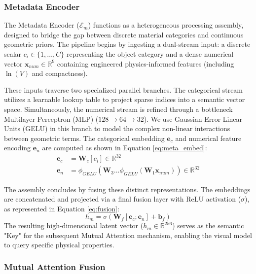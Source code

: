 \documentclass[journal,twoside,web]{ieeecolor}
\begin{document}
\subsubsection{Metadata Encoder}

The Metadata Encoder ($\mathcal{E}_m$) functions as a heterogeneous processing assembly, designed to bridge the gap between discrete material categories and continuous geometric priors. The pipeline begins by ingesting a dual-stream input: a discrete scalar $c_i \in \{1, \dots, C\}$ representing the object category and a dense numerical vector $\mathbf{x}_{num} \in \mathbb{R}^{9}$ containing engineered physics-informed features (including $\ln(V)$ and compactness).

These inputs traverse two specialized parallel branches. The categorical stream utilizes a learnable lookup table to project sparse indices into a semantic vector space. Simultaneously, the numerical stream is refined through a bottleneck Multilayer Perceptron (MLP) ($128 \rightarrow 64 \rightarrow 32$). We use Gaussian Error Linear Units (GELU) in this branch to model the complex non-linear interactions between geometric terms. The categorical embedding $\mathbf{e}_c$ and numerical feature encoding $\mathbf{e}_n$ are computed as shown in Equation \eqref{eq:meta_embed}:
\begin{equation} \label{eq:meta_embed}
\begin{split}
    \mathbf{e}_c &= \mathbf{W}_c[c_i] \in \mathbb{R}^{32} \\
    \mathbf{e}_n &= \phi_{GELU}(\mathbf{W}_3 \dots \phi_{GELU}(\mathbf{W}_1 \mathbf{x}_{num})) \in \mathbb{R}^{32}
\end{split}
\end{equation}

The assembly concludes by fusing these distinct representations. The embeddings are concatenated and projected via a final fusion layer with ReLU activation ($\sigma$), as represented in Equation \eqref{eq:fusion}:
\begin{equation} \label{eq:fusion}
    h_m = \sigma(\mathbf{W}_f [\mathbf{e}_c; \mathbf{e}_n] + \mathbf{b}_f)
\end{equation}
The resulting high-dimensional latent vector ($h_m \in \mathbb{R}^{256}$) serves as the semantic "Key" for the subsequent Mutual Attention mechanism, enabling the visual model to query specific physical properties.
\subsubsection{Mutual Attention Fusion}
\end{document}
